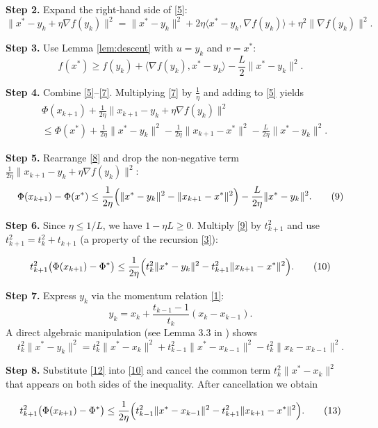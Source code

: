 \documentclass{article}
\begin{document}
\noindent\textbf{Step 2.} Expand the right‑hand side of \eqref{5}:
\[
\|x^{*}-y_{k}+\eta\nabla f(y_{k})\|^{2}
= \|x^{*}-y_{k}\|^{2}+2\eta\langle x^{*}-y_{k},\nabla f(y_{k})\rangle+\eta^{2}\|\nabla f(y_{k})\|^{2}. \tag{6}
\]

\noindent\textbf{Step 3.} Use Lemma \ref{lem:descent} with $u=y_{k}$ and $v=x^{*}$:
\[
f(x^{*})\ge f(y_{k})+\langle\nabla f(y_{k}),x^{*}-y_{k}\rangle-\frac{L}{2}\|x^{*}-y_{k}\|^{2}. \tag{7}
\]

\noindent\textbf{Step 4.} Combine \eqref{5}–\eqref{7}.  Multiplying \eqref{7} by $\frac{1}{\eta}$ and adding to \eqref{5} yields
\[
\begin{aligned}
&\Phi(x_{k+1}) +\frac{1}{2\eta}\|x_{k+1}-y_{k}+\eta\nabla f(y_{k})\|^{2}\\
&\le \Phi(x^{*})+\frac{1}{2\eta}\|x^{*}-y_{k}\|^{2}
-\frac{1}{2\eta}\|x_{k+1}-x^{*}\|^{2}
-\frac{L}{2\eta}\|x^{*}-y_{k}\|^{2}. \tag{8}
\end{aligned}
\]

\noindent\textbf{Step 5.} Rearrange \eqref{8} and drop the non‑negative term $\frac{1}{2\eta}\|x_{k+1}-y_{k}+\eta\nabla f(y_{k})\|^{2}$:
\[
\Phi(x_{k+1})-\Phi(x^{*})\le
\frac{1}{2\eta}\Bigl(\|x^{*}-y_{k}\|^{2}-\|x_{k+1}-x^{*}\|^{2}\Bigr)
-\frac{L}{2\eta}\|x^{*}-y_{k}\|^{2}. \tag{9}
\]

\noindent\textbf{Step 6.} Since $\eta\le 1/L$, we have $1-\eta L\ge 0$.  Multiply \eqref{9} by $t_{k+1}^{2}$ and use $t_{k+1}^{2}=t_{k}^{2}+t_{k+1}$ (a property of the recursion \eqref{3}):

\[
t_{k+1}^{2}\bigl(\Phi(x_{k+1})-\Phi^{*}\bigr)
\le \frac{1}{2\eta}\Bigl(t_{k}^{2}\|x^{*}-y_{k}\|^{2}
- t_{k+1}^{2}\|x_{k+1}-x^{*}\|^{2}\Bigr). \tag{10}
\]

\noindent\textbf{Step 7.} Express $y_{k}$ via the momentum relation \eqref{1}:
\[
y_{k}=x_{k}+ \frac{t_{k-1}-1}{t_{k}}(x_{k}-x_{k-1}). \tag{11}
\]
A direct algebraic manipulation (see Lemma 3.3 in \cite{Beck2009}) shows
\[
t_{k}^{2}\|x^{*}-y_{k}\|^{2}=t_{k}^{2}\|x^{*}-x_{k}\|^{2}+t_{k-1}^{2}\|x^{*}-x_{k-1}\|^{2}
- t_{k}^{2}\|x_{k}-x_{k-1}\|^{2}. \tag{12}
\]

\noindent\textbf{Step 8.} Substitute \eqref{12} into \eqref{10} and cancel the common term $t_{k}^{2}\|x^{*}-x_{k}\|^{2}$ that appears on both sides of the inequality.  After cancellation we obtain

\[
t_{k+1}^{2}\bigl(\Phi(x_{k+1})-\Phi^{*}\bigr)
\le \frac{1}{2\eta}\Bigl(t_{k-1}^{2}\|x^{*}-x_{k-1}\|^{2}
- t_{k+1}^{2}\|x_{k+1}-x^{*}\|^{2}\Bigr). \tag{13}
\]
\end{document}
